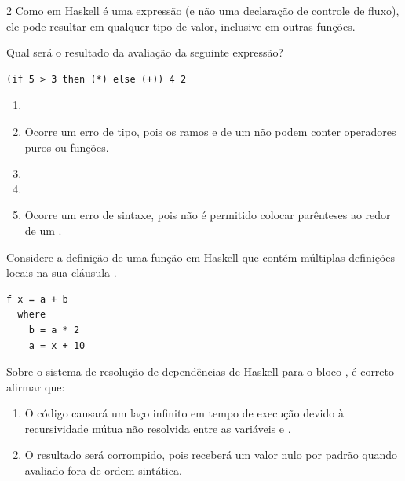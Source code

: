 \documentclass[a4paper,10pt,brazil]{article}
\begin{document}
\begin{multicols}{2}
Como  em Haskell é uma expressão (e não uma declaração de controle de fluxo), ele pode resultar em qualquer tipo de valor, inclusive em outras funções. 

Qual será o resultado da avaliação da seguinte expressão?
\begin{verbatim}
(if 5 > 3 then (*) else (+)) 4 2
\end{verbatim}

\begin{enumerate}
  \item {}

  \item Ocorre um erro de tipo, pois os ramos  e  de um  não podem conter operadores puros ou funções.

  \item {}

  \item {}

  \item Ocorre um erro de sintaxe, pois não é permitido colocar parênteses ao redor de um .


\end{enumerate}

Considere a definição de uma função  em Haskell que contém múltiplas definições locais na sua cláusula . 
\begin{verbatim}
f x = a + b
  where
    b = a * 2
    a = x + 10
\end{verbatim}
Sobre o sistema de resolução de dependências de Haskell para o bloco , é correto afirmar que:

\begin{enumerate}
  \item O código causará um laço infinito em tempo de execução devido à recursividade mútua não resolvida entre as variáveis  e .

  \item O resultado será corrompido, pois  receberá um valor nulo por padrão quando avaliado fora de ordem sintática.


\end{enumerate}
\end{multicols}
\end{document}
